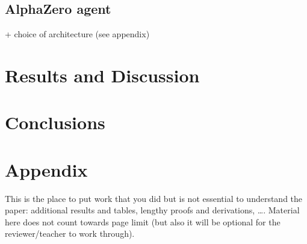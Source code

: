 \documentclass[journal, a4paper]{IEEEtran}
\begin{document}
\subsection{AlphaZero agent}

+ choice of architecture (see appendix)


\section{Results and Discussion}
\label{sec:results}


\section{Conclusions}
\label{sec:conclusion}




\newpage
\section*{Appendix}
This is the place to put work that you did but is not essential to understand the paper: additional results and tables, lengthy proofs and derivations, \ldots. Material here does not count towards page limit (but also it will be optional for the reviewer/teacher to work through). 
\end{document}
